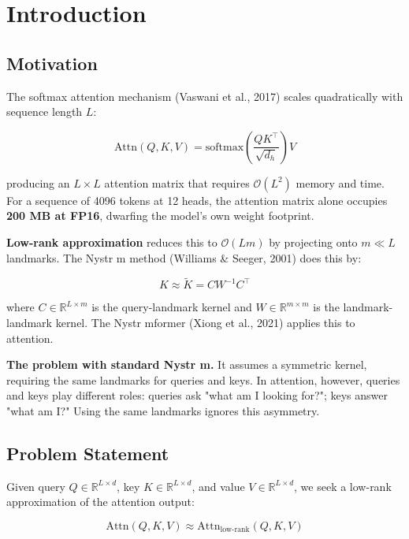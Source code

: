 
\section{Introduction}

\subsection{Motivation}

The softmax attention mechanism (Vaswani et al., 2017) scales quadratically 
with sequence length $L$:

\begin{equation}
\text{Attn}(Q, K, V) = \text{softmax}\!\left(\frac{Q K^\top}{\sqrt{d_h}}\right) V
\end{equation}

producing an $L \times L$ attention matrix that requires $\mathcal{O}(L^2)$ 
memory and time. For a sequence of 4096 tokens at 12 heads, the attention 
matrix alone occupies \textbf{200 MB at FP16}, dwarfing the model's own weight 
footprint.

\textbf{Low-rank approximation} reduces this to $\mathcal{O}(L m)$ by projecting 
onto $m \ll L$ landmarks. The Nystr m method (Williams \& Seeger, 2001) does 
this by:

\begin{equation}
K \approx \tilde{K} = C W^{-1} C^\top
\end{equation}

where $C \in \mathbb{R}^{L \times m}$ is the query-landmark kernel and 
$W \in \mathbb{R}^{m \times m}$ is the landmark-landmark kernel. The 
Nystr mformer (Xiong et al., 2021) applies this to attention.

\textbf{The problem with standard Nystr m.} It assumes a symmetric kernel, 
requiring the same landmarks for queries and keys. In attention, however, 
queries and keys play different roles: queries ask "what am I looking for?"; 
keys answer "what am I?" Using the same landmarks ignores this asymmetry.

\subsection{Problem Statement}

Given query $Q \in \mathbb{R}^{L \times d}$, key $K \in \mathbb{R}^{L \times d}$, 
and value $V \in \mathbb{R}^{L \times d}$, we seek a low-rank approximation 
of the attention output:

\begin{equation}
\text{Attn}(Q, K, V) \approx \text{Attn}_\text{low-rank}(Q, K, V)
\end{equation}

